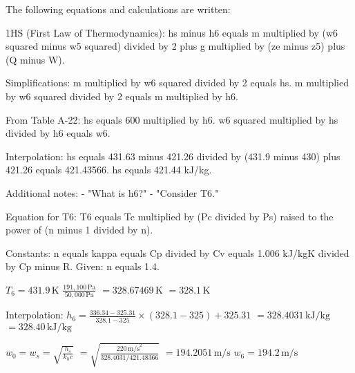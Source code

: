 The following equations and calculations are written:  

1HS (First Law of Thermodynamics):  
hs minus h6 equals m multiplied by (w6 squared minus w5 squared) divided by 2 plus g multiplied by (ze minus z5) plus (Q minus W).  

Simplifications:  
m multiplied by w6 squared divided by 2 equals hs.  
m multiplied by w6 squared divided by 2 equals m multiplied by h6.  

From Table A-22:  
hs equals 600 multiplied by h6.  
w6 squared multiplied by hs divided by h6 equals w6.  

Interpolation:  
hs equals 431.63 minus 421.26 divided by (431.9 minus 430) plus 421.26 equals 421.43566.  
hs equals 421.44 kJ/kg.  

Additional notes:  
- "What is h6?"  
- "Consider T6."  

Equation for T6:  
T6 equals Tc multiplied by (Pc divided by Ps) raised to the power of (n minus 1 divided by n).  

Constants:  
n equals kappa equals Cp divided by Cv equals 1.006 kJ/kgK divided by Cp minus R.  
Given: n equals 1.4.

\( T_6 = 431.9 \, \text{K} \)  
\( \frac{191,100 \, \text{Pa}}{50,000 \, \text{Pa}} \)  
\( = 328.67469 \, \text{K} \)  
\( = 328.1 \, \text{K} \)  

Interpolation:  
\( h_6 = \frac{336.34 - 325.31}{328.1 - 325} \times (328.1 - 325) + 325.31 \)  
\( = 328.4031 \, \text{kJ/kg} \)  
\( = 328.40 \, \text{kJ/kg} \)  

\( w_0 = w_s = \sqrt{\frac{h_s}{k_hc}} \)  
\( = \sqrt{\frac{220 \, \text{m/s}^2}{328.4031 / 421.48366}} \)  
\( = 194.2051 \, \text{m/s} \)  
\( w_6 = 194.2 \, \text{m/s} \)